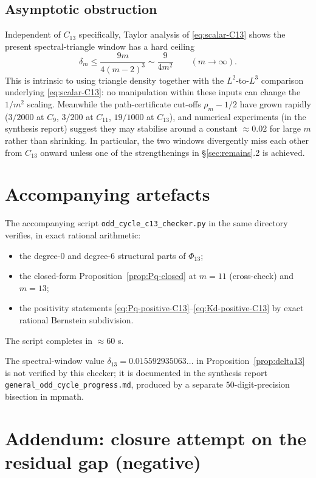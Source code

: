 \documentclass[11pt]{article}
\begin{document}
\subsection{Asymptotic obstruction}

Independent of $C_{13}$ specifically, Taylor analysis of \eqref{eq:scalar-C13} shows the present spectral-triangle window has a hard ceiling
\[
        \delta_m \le \frac{9 m}{4 (m-2)^3} \sim \frac{9}{4 m^2}
        \qquad (m \to \infty).
\]
This is intrinsic to using triangle density together with the $L^2$-to-$L^3$ comparison underlying \eqref{eq:scalar-C13}: no manipulation within these inputs can change the $1/m^2$ scaling.  Meanwhile the path-certificate cut-offs $\rho_m - 1/2$ have grown rapidly ($3/2000$ at $C_9$, $3/200$ at $C_{11}$, $19/1000$ at $C_{13}$), and numerical experiments (in the synthesis report) suggest they may stabilise around a constant $\approx 0.02$ for large $m$ rather than shrinking.  In particular, the two windows divergently miss each other from $C_{13}$ onward unless one of the strengthenings in \S\ref{sec:remains}.2 is achieved.

\section*{Accompanying artefacts}

The accompanying script \texttt{odd\_cycle\_c13\_checker.py} in the same directory verifies, in exact rational arithmetic:
\begin{itemize}[leftmargin=2em]
\item the degree-$0$ and degree-$6$ structural parts of $\Phi_{13}$;
\item the closed-form Proposition~\ref{prop:Pq-closed} at $m = 11$ (cross-check) and $m = 13$;
\item the positivity statements \eqref{eq:Pq-positive-C13}--\eqref{eq:Kd-positive-C13} by exact rational Bernstein subdivision.
\end{itemize}
The script completes in $\approx 60$ s.

The spectral-window value $\delta_{13} = 0.015592935063\ldots$ in Proposition~\ref{prop:delta13} is not verified by this checker; it is documented in the synthesis report \texttt{general\_odd\_cycle\_progress.md}, produced by a separate $50$-digit-precision bisection in mpmath.

\section{Addendum: closure attempt on the residual gap (negative)}\label{sec:closure-attempt}
\end{document}
